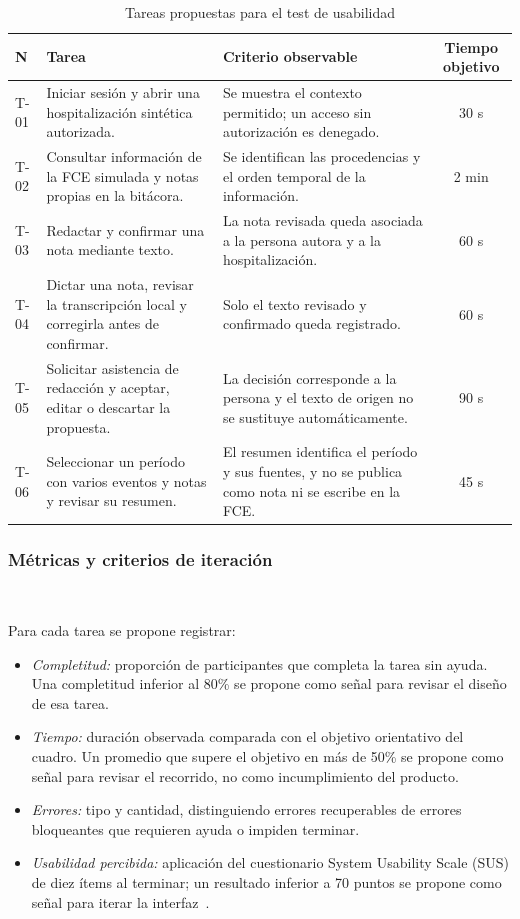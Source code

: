 \begin{table}[H]
\caption{Tareas propuestas para el test de usabilidad}
\label{tab:tareas_test_usabilidad}
\begin{tabularx}{\textwidth}{|l|X|X|c|}
\hline
\textbf{N} & \textbf{Tarea} & \textbf{Criterio observable} & \textbf{Tiempo objetivo} \\
\hline
T-01 & Iniciar sesión y abrir una hospitalización sintética autorizada. & Se muestra el contexto permitido; un acceso sin autorización es denegado. & 30 s \\
\hline
T-02 & Consultar información de la FCE simulada y notas propias en la bitácora. & Se identifican las procedencias y el orden temporal de la información. & 2 min \\
\hline
T-03 & Redactar y confirmar una nota mediante texto. & La nota revisada queda asociada a la persona autora y a la hospitalización. & 60 s \\
\hline
T-04 & Dictar una nota, revisar la transcripción local y corregirla antes de confirmar. & Solo el texto revisado y confirmado queda registrado. & 60 s \\
\hline
T-05 & Solicitar asistencia de redacción y aceptar, editar o descartar la propuesta. & La decisión corresponde a la persona y el texto de origen no se sustituye automáticamente. & 90 s \\
\hline
T-06 & Seleccionar un período con varios eventos y notas y revisar su resumen. & El resumen identifica el período y sus fuentes, y no se publica como nota ni se escribe en la FCE. & 45 s \\
\hline
\end{tabularx}
\end{table}

\subsubsection*{Métricas y criterios de iteración} ~

Para cada tarea se propone registrar:

\begin{itemize}
    \item \textit{Completitud:} proporción de participantes que completa la tarea sin ayuda. Una completitud inferior al 80\% se propone como señal para revisar el diseño de esa tarea.
    \item \textit{Tiempo:} duración observada comparada con el objetivo orientativo del cuadro. Un promedio que supere el objetivo en más de 50\% se propone como señal para revisar el recorrido, no como incumplimiento del producto.
    \item \textit{Errores:} tipo y cantidad, distinguiendo errores recuperables de errores bloqueantes que requieren ayuda o impiden terminar.
    \item \textit{Usabilidad percibida:} aplicación del cuestionario System Usability Scale (SUS) de diez ítems al terminar; un resultado inferior a 70 puntos se propone como señal para iterar la interfaz~\cite{ref_brooke_sus}.
\end{itemize}

